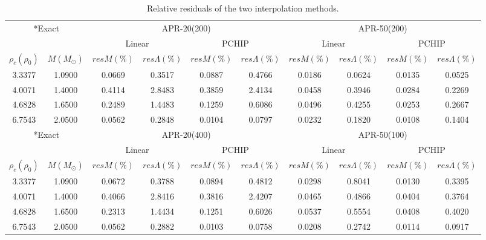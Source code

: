 \documentclass[aps,prl,a4paper,twocolumn,floats,amsmath,amssymb,nofootinbib,showpacs]{revtex4-1}
\begin{document}
\begin{table}[!htbp]
\centering
\begin{tabular}{|c|c|c|c|c|c|c|c|c|c|}
\hline
\multicolumn{2}{|c|}{ \multirow{2}*{Exact} } & \multicolumn{4}{c|}{APR-20(200)} & \multicolumn{4}{c|}{APR-50(200)}\\
\cline{3-10}
\multicolumn{2}{|c|}{} & \multicolumn{2}{c|}{Linear} & \multicolumn{2}{c|}{PCHIP} & \multicolumn{2}{c|}{Linear} & \multicolumn{2}{c|}{PCHIP}\\
\hline
 $\rho_c(\rho_0)$ & $M(M_{\odot})$ & $resM(\%)$ & $res\Lambda(\%)$ & $resM(\%)$ & $res\Lambda(\%)$ & $resM(\%)$ & $res\Lambda(\%)$ & $resM(\%)$ & $res\Lambda(\%)$\\
\hline
3.3377&1.0900 	&0.0669	&0.3517	&0.0887	&0.4766	&0.0186	&0.0624	&0.0135	&0.0525\\
4.0071&1.4000	&0.4114	&2.8483	&0.3859	&2.4134	&0.0458	&0.3946	&0.0284	&0.2269\\
4.6828&1.6500 	&0.2489	&1.4483	&0.1259	&0.6086	&0.0496	&0.4255	&0.0253	&0.2667\\
6.7543&2.0500 	&0.0562	&0.2848	&0.0104	&0.0797	&0.0232	&0.1820	&0.0108	&0.1404\\
\hline
\multicolumn{2}{|c|}{ \multirow{2}*{Exact} } & \multicolumn{4}{c|}{APR-20(400)} & \multicolumn{4}{c|}{APR-50(100)}\\
\cline{3-10}
\multicolumn{2}{|c|}{} & \multicolumn{2}{c|}{Linear} & \multicolumn{2}{c|}{PCHIP} & \multicolumn{2}{c|}{Linear} & \multicolumn{2}{c|}{PCHIP}\\
\hline
 $\rho_c(\rho_0)$ & $M(M_{\odot})$ & $resM(\%)$ & $res\Lambda(\%)$ & $resM(\%)$ & $res\Lambda(\%)$ & $resM(\%)$ & $res\Lambda(\%)$ & $resM(\%)$ & $res\Lambda(\%)$\\
\hline
3.3377&1.0900 	&0.0672	&0.3788	&0.0894	&0.4812	&0.0298	&0.8041	&0.0130	&0.3395\\
4.0071&1.4000	&0.4066	&2.8416	&0.3816	&2.4207	&0.0465	&0.4866	&0.0404	&0.3764\\
4.6828&1.6500 	&0.2313	&1.4434	&0.1251	&0.6026	&0.0537	&0.5554	&0.0408	&0.4020\\
6.7543&2.0500 	&0.0562	&0.2882	&0.0103	&0.0758	&0.0208	&0.2742	&0.0114	&0.0917\\
\hline
\end{tabular}
\caption{Relative residuals of the two interpolation methods.}\label{Umesh}
\end{table}
\end{document}
